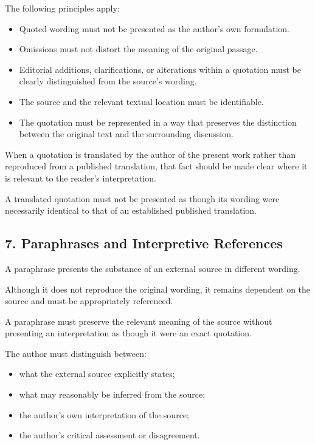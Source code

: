 The following principles apply:

\begin{itemize}
    \item Quoted wording must
    not be presented as the
    author's own formulation.

    \item Omissions must not
    distort the meaning of
    the original passage.

    \item Editorial additions,
    clarifications, or alterations
    within a quotation must
    be clearly distinguished
    from the source's wording.

    \item The source and the
    relevant textual location
    must be identifiable.

    \item The quotation must
    be represented in a way
    that preserves the distinction
    between the original text
    and the surrounding discussion.
\end{itemize}

When a quotation is translated
by the author of the present
work rather than reproduced
from a published translation,
that fact should be made clear
where it is relevant to the
reader's interpretation.

A translated quotation must
not be presented as though
its wording were necessarily
identical to that of an
established published translation.


\subsection*{7. Paraphrases and Interpretive
References}

A paraphrase presents the
substance of an external
source in different wording.

Although it does not reproduce
the original wording, it remains
dependent on the source and
must be appropriately referenced.

A paraphrase must preserve
the relevant meaning of the
source without presenting
an interpretation as though
it were an exact quotation.

The author must distinguish
between:

\begin{itemize}
    \item what the external
    source explicitly states;
    \item what may reasonably
    be inferred from the source;
    \item the author's own
    interpretation of the source;
    \item the author's critical
    assessment or disagreement.
\end{itemize}

